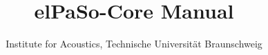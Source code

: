 \documentclass[12pt,a4paper,oneside]{scrreprt}
\begin{document}
\parindent 0pt
\title{elPaSo-Core Manual}
\date{\the\year{}}
\author{\Large Institute for Acoustics, Technische Universität Braunschweig}
\maketitle
{}
\tableofcontents
\cleardoublepage
{}




%
\end{document}

